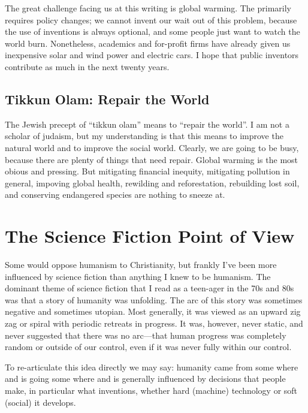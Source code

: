 \documentclass[
	fontsize=10pt, %
	twoside=false, %
	secnumdepth=1, %
]{kaobook}
\begin{document}
The great challenge facing us at this writing is
global warming.
The primarily requires policy changes; we cannot
invent our wait out of this problem, because the
use of inventions is always optional, and some people
just want to watch the world burn.
Nonetheless, academics and for-profit firms have
already given us inexpensive solar and wind power and electric cars.
I hope that public inventors contribute as much in the next twenty years.

\section{Tikkun Olam: Repair the World}

The Jewish precept of ``tikkun olam'' means to ``repair the world''.
I am not a scholar of judaism, but my understanding is that this
means to improve the natural world and to improve the social world.
Clearly, we are going to be busy, because there are plenty of things
that need repair. Global warming is the most obious and pressing.
But mitigating financial inequity, mitigating pollution in general,
impoving global health, rewilding and reforestation, rebuilding
lost soil, and conserving endangered species are nothing to sneeze at.

\chapter{The Science Fiction Point of View}

Some would oppose humanism to Christianity, but frankly I've
been more influenced by science fiction than anything I knew
to be humanism. The dominant theme of science fiction
that I read as a teen-ager in the 70s and 80s was that
a story of humanity was unfolding.
The arc of this story was sometimes negative and sometimes
utopian. Most generally, it was viewed as an upward
zig zag or spiral with periodic retreats in progress.
It was, however, never static, and never suggested that
there was no arc---that human progress was completely random
or outside of our control, even if it was never fully within our
control.

To re-articulate this idea directly we may say:
humanity came from some where and is going some where and
is generally influenced by decisions that people make,
in particular what inventions, whether hard (machine)
technology or soft (social) it develops.
\end{document}
